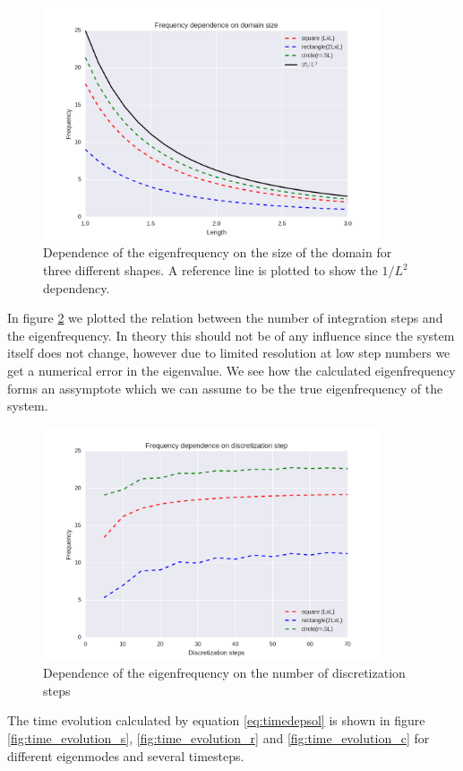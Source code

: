 \documentclass[a4paper]{article}
\begin{document}
\begin{figure}
\centering
\includegraphics[width=10cm]{Pictures/L_dependence.png}
\caption{Dependence of the eigenfrequency on the size of the domain for three different shapes. A reference line is plotted to show the  $1/L^2$ dependency.}
\label{fig:L_dependence}
\end{figure}

In figure \ref{fig:dstep_dependence} we plotted the relation between 
the number of integration steps and the eigenfrequency. In theory this should not be of any influence since the system itself does not change, however due to limited resolution at low step numbers we get a numerical error in the eigenvalue. We see how the calculated eigenfrequency forms an assymptote which we can assume to be the true eigenfrequency of the system. 

\begin{figure}
\centering
\includegraphics[width=10cm]{Pictures/dstep_dependence.png}
\caption{Dependence of the eigenfrequency on the number of discretization steps}
\label{fig:dstep_dependence}
\end{figure}

The time evolution calculated by equation \ref{eq:timedepsol} is shown in figure \ref{fig:time_evolution_s}, \ref{fig:time_evolution_r} and \ref{fig:time_evolution_c} for different eigenmodes and several timesteps. 
\end{document}
